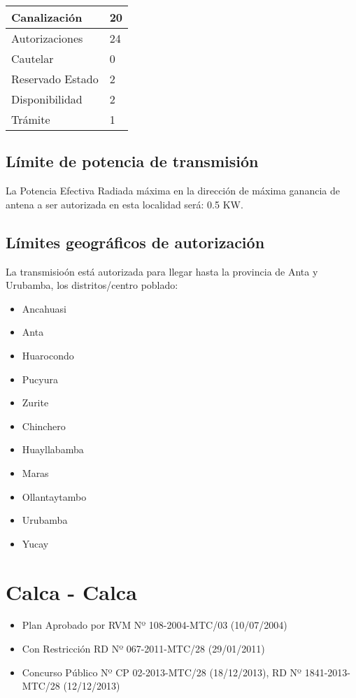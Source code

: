 \documentclass[a4paper]{IEEEtran} %
\begin{document}
\begin{tabular}{|l|l|} \hline
	Canalización 			& 20 \\ \hline
	Autorizaciones			& 24 \\ \hline
	Cautelar				& 0 \\ \hline
	Reservado Estado		& 2 \\ \hline
	Disponibilidad			& 2 \\ \hline
	Trámite					& 1 \\ \hline 
\end{tabular}

\subsection{Límite de potencia de transmisión}

La Potencia Efectiva Radiada máxima en la dirección de máxima ganancia de antena a ser autorizada en esta localidad será: 0.5 KW.

\subsection{Límites geográficos de autorización}

La transmisioón está autorizada para llegar hasta la provincia de Anta y Urubamba, los distritos/centro poblado:

\begin{itemize}
	\item Ancahuasi
	\item Anta 
	\item Huarocondo 
	\item Pucyura
	\item Zurite
	\item Chinchero
	\item Huayllabamba
	\item Maras
	\item Ollantaytambo
	\item Urubamba
	\item Yucay
\end{itemize}




\section{Calca - Calca}

\begin{itemize}
	\item Plan Aprobado por RVM Nº 108-2004-MTC/03 (10/07/2004)
	\item Con Restricción RD Nº 067-2011-MTC/28 (29/01/2011)
	\item Concurso Público Nº CP 02-2013-MTC/28 (18/12/2013), RD Nº 1841-2013-MTC/28 (12/12/2013)
\end{itemize}
\end{document}
